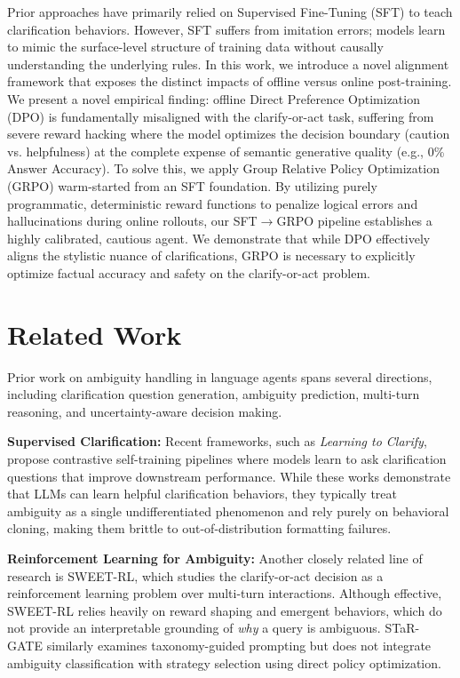 \documentclass{article}
\theoremstyle{plain}
\theoremstyle{definition}
\theoremstyle{remark}
\begin{document}
Prior approaches have primarily relied on Supervised Fine-Tuning (SFT) to teach clarification behaviors. However, SFT suffers from imitation errors; models learn to mimic the surface-level structure of training data without causally understanding the underlying rules. In this work, we introduce a novel alignment framework that exposes the distinct impacts of offline versus online post-training. We present a novel empirical finding: offline Direct Preference Optimization (DPO) is fundamentally misaligned with the clarify-or-act task, suffering from severe reward hacking where the model optimizes the decision boundary (caution vs. helpfulness) at the complete expense of semantic generative quality (e.g., 0\% Answer Accuracy). To solve this, we apply Group Relative Policy Optimization (GRPO) warm-started from an SFT foundation. By utilizing purely programmatic, deterministic reward functions to penalize logical errors and hallucinations during online rollouts, our SFT$\rightarrow$GRPO pipeline establishes a highly calibrated, cautious agent. We demonstrate that while DPO effectively aligns the stylistic nuance of clarifications, GRPO is necessary to explicitly optimize factual accuracy and safety on the clarify-or-act problem.

\section{Related Work}

Prior work on ambiguity handling in language agents spans several directions, including clarification question generation, ambiguity prediction, multi-turn reasoning, and uncertainty-aware decision making. 

\textbf{Supervised Clarification:} Recent frameworks, such as \emph{Learning to Clarify}, propose contrastive self-training pipelines where models learn to ask clarification questions that improve downstream performance. While these works demonstrate that LLMs can learn helpful clarification behaviors, they typically treat ambiguity as a single undifferentiated phenomenon and rely purely on behavioral cloning, making them brittle to out-of-distribution formatting failures.

\textbf{Reinforcement Learning for Ambiguity:} Another closely related line of research is SWEET-RL, which studies the clarify-or-act decision as a reinforcement learning problem over multi-turn interactions. Although effective, SWEET-RL relies heavily on reward shaping and emergent behaviors, which do not provide an interpretable grounding of \emph{why} a query is ambiguous. STaR-GATE similarly examines taxonomy-guided prompting but does not integrate ambiguity classification with strategy selection using direct policy optimization.
\end{document}
